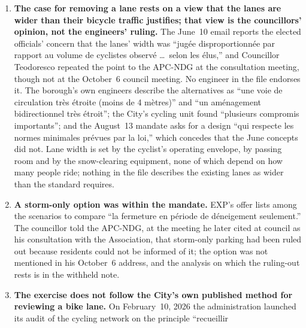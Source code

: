 \documentclass[11pt,letterpaper]{article}
\begin{document}
\begin{enumerate}[nosep]
\begin{minipage}[t]{\linewidth}
    full.\end{minipage}\vspace{0.35em}
\item \begin{minipage}[t]{\linewidth}\textbf{The case for removing a lane rests on a view that the lanes are
    wider than their bicycle traffic justifies; that view is the
    councillors' opinion, not the engineers' ruling.} The June~10 email
    reports the elected officials' concern that the lanes' width was ``jug\'ee
    disproportionn\'ee par rapport au volume de cyclistes observ\'e \ldots\
    selon les \'elus,'' and Councillor Teodoresco repeated the point to the
    APC-NDG at the consultation meeting, though not at the October~6 council
    meeting. No engineer in the file endorses it. The borough's own engineers
    describe the alternatives as ``une voie de circulation tr\`es \'etroite
    (moins de 4 m\`etres)'' and ``un am\'enagement bidirectionnel tr\`es
    \'etroit''; the City's cycling unit found ``plusieurs compromis
    importants''; and the August~13 mandate asks for a design ``qui respecte
    les normes minimales pr\'evues par la loi,'' which concedes that the June
    concepts did not. Lane width is set by the cyclist's operating envelope,
    by passing room and by the snow-clearing equipment, none of which depend
    on how many people ride; nothing in the file describes the existing
    lanes as wider than the standard requires.\end{minipage}\vspace{0.35em}
\item \begin{minipage}[t]{\linewidth}\textbf{A storm-only option was within the mandate.} EXP's offer
    lists among the scenarios to compare ``la fermeture en p\'eriode de
    d\'eneigement seulement.'' The councillor told the APC-NDG, at the meeting
    he later cited at council as his consultation with the Association, that
    storm-only parking had been ruled out because residents could not be
    informed of it; the option was not mentioned in his October~6 address,
    and the analysis on which the ruling-out rests is in the withheld note.\end{minipage}\vspace{0.35em}
\item \begin{minipage}[t]{\linewidth}\textbf{The exercise does not follow the City's own published method
    for reviewing a bike lane.} On February~10, 2026 the administration
    launched its audit of the cycling network on the principle ``recueillir

\end{minipage}
\end{enumerate}
\end{document}
